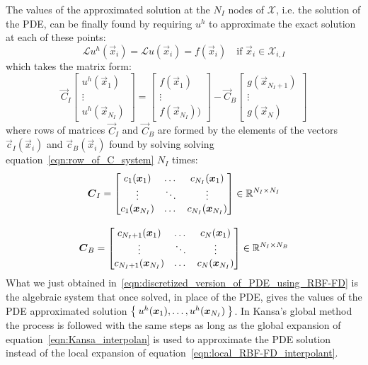 \medskip
The values of the approximated solution at the $N_I$ nodes of $\mathcal{X}$, i.e. the solution of the PDE, can be finally found by requiring $u^h$ to approximate the exact solution at each of these points:
\begin{equation}
	\mathcal{L}u^h(\vec{x}_i) = \mathcal{L}u(\vec{x}_i) = f(\vec{x}_i)  \quad  \text{if $\vec{x}_i \in \mathcal{X}_{i,I}$}
\end{equation}
which takes the matrix form:
\begin{equation}
\label{eqn:discretized_version_of_PDE_using_RBF-FD}
\vec{C}_I
\begin{bmatrix}
	u^h(\vec{x}_1)  \\
	\vdots			\\
	u^h(\vec{x}_{N_I})
\end{bmatrix}
=
\begin{bmatrix}
	f(\vec{x}_1)  \\
	\vdots		  \\
	f(\vec{x}_{N_I}))
\end{bmatrix}
-
\vec{C}_B
\begin{bmatrix}
	g(\vec{x}_{N_I+1})  \\
	\vdots				\\
	g(\vec{x}_{N})
\end{bmatrix}
\end{equation}
where rows of matrices $\vec{C}_I$ and $\vec{C}_B$ are formed by the elements of the vectors $\vec{c}_I(\vec{x}_i)$ and $\vec{c}_B(\vec{x}_i)$ found by solving solving equation~\eqref{eqn:row_of_C_system} $N_I$ times:
\begin{equation}
	\begin{gathered}
		\boldsymbol{C}_I = \begin{bmatrix}
						c_1{(\boldsymbol{x}_1)}  	&  \dots  & c_{N_I}(\boldsymbol{x}_1)  	\\
						\vdots				& \ddots  & \vdots					\\
						c_1{(\boldsymbol{x}_{N_I})}  &  \dots  & c_{N_I}(\boldsymbol{x}_{N_I})
					\end{bmatrix} \in \mathbb{R}^{N_I \times N_I}  \\[2ex]
		\boldsymbol{C}_B = \begin{bmatrix}
						c_{N_I+1}{(\boldsymbol{x}_1)}  	  &  \dots  & c_{N}(\boldsymbol{x}_1)  	\\
						\vdots					  & \ddots  & \vdots				\\
						c_{N_I+1}{(\boldsymbol{x}_{N_I})}  &  \dots  & c_{N}(\boldsymbol{x}_{N_I})
					\end{bmatrix} \in \mathbb{R}^{N_I \times N_B}
	\end{gathered}
\end{equation}
What we just obtained in~\eqref{eqn:discretized_version_of_PDE_using_RBF-FD} is the algebraic system that once solved, in place of the PDE, gives the values of the PDE approximated solution $\Set{u^h(\boldsymbol{x}_1), \dots, u^h(\boldsymbol{x}_{N_I})}$. In Kansa's global method the process is followed with the same steps as long as the global expansion of equation~\eqref{eqn:Kansa_interpolan} is used to approximate the PDE solution instead of the local expansion of equation~\eqref{eqn:local_RBF-FD_interpolant}.

